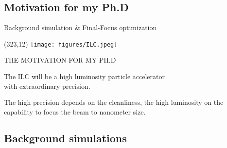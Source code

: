 \documentclass[xcolor={dvipsnames}]{beamer}
\newcommand{\ilclogo}{
  \setlength{\TPHorizModule}{1pt}
  \setlength{\TPVertModule}{1pt}
  \begin{textblock}{1}(323,12)
   \texttt{[image: figures/ILC.jpeg]}
  \end{textblock}
}
\begin{document}
\subsection{Motivation for my Ph.D}
\begin{frame}{Background simulation \& Final-Focus optimization}
\ilclogo
\begin{center}
 \alert{\MakeUppercase{The motivation for my Ph.D}}
\end{center}
\begin{block}{}
\centering The ILC will be a \textcolor{Periwinkle}{high luminosity} particle accelerator \\with \textcolor{JungleGreen}{extraordinary precision}.
\end{block}
\vspace*{1cm}
\textcolor{JungleGreen}{The high precision depends on the cleanliness}, \textcolor{Periwinkle}{the high luminosity on the capability to focus the beam to nanometer size}.\\
\vspace*{0.5cm}
\end{frame}

\subsection{Background simulations}
\end{document}
